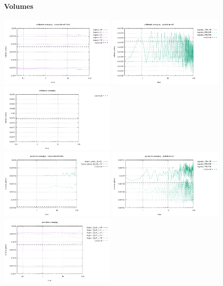 \paragraph{Volumes}
\begin{center}
\includegraphics[width=5.7cm]{images/stokes_sphere_fs2D/vol_sphere_arithm_comp}
\includegraphics[width=5.7cm]{images/stokes_sphere_fs2D/vol_sphere_arithm_pic}
\includegraphics[width=5.7cm]{images/stokes_sphere_fs2D/vol_sphere_arithm_add}\\
\includegraphics[width=5.7cm]{images/stokes_sphere_fs2D/vol_sphere_geom_comp}
\includegraphics[width=5.7cm]{images/stokes_sphere_fs2D/vol_sphere_geom_pic}
\includegraphics[width=5.7cm]{images/stokes_sphere_fs2D/vol_sphere_geom_add}\\

\end{center}
